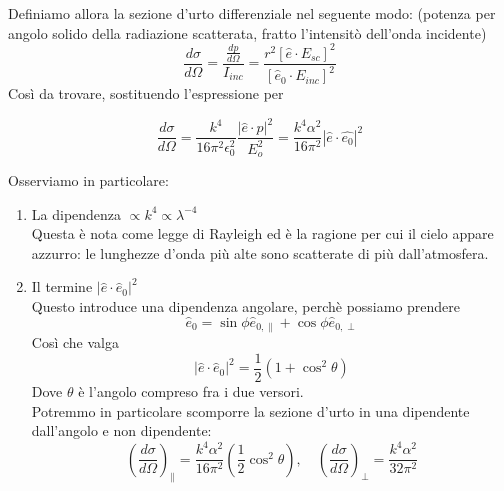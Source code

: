 \documentclass{report}
\begin{document}
    Definiamo allora la sezione d'urto differenziale nel seguente modo: (potenza per angolo solido della radiazione scatterata, fratto l'intensitò dell'onda incidente)
    \begin{equation}
        \frac{d\sigma}{d\Omega} = \frac{\frac{dp}{d\Omega}}{I_{inc}} = \frac{r^2[\hat{e}\cdot E_{sc}]^2}{[\hat{e}_0 \cdot E_{inc}]^2}
    \end{equation}
    Così da trovare, sostituendo l'espressione per 
    \begin{tcolorbox}[colback=doc!15, colframe=black, boxrule=1pt]
    \begin{equation}
        \frac{d\sigma}{d\Omega} = \frac{k^4}{16\pi^2\epsilon_0^2}\frac{|\hat{e}\cdot p|^2}{E_o^2} = \frac{k^4\alpha^2}{16\pi^2}|\hat{e}\cdot \hat{e_0}|^2
    \end{equation}
    \end{tcolorbox}

    Osserviamo in particolare: 
    \begin{enumerate}
        \item La dipendenza $\propto k^4 \propto \lambda^{-4}$ \\
        Questa è nota come legge di Rayleigh ed è la ragione per cui il cielo appare azzurro: le lunghezze d'onda più alte sono scatterate di più dall'atmosfera.
        \item Il termine $|\hat{e}\cdot \hat{e}_0|^2$ \\ 
        Questo introduce una dipendenza angolare, perchè possiamo prendere
        \begin{equation}
            \hat{e}_0 = \sin\phi \hat{e}_{0, \parallel} + \cos\phi \hat{e}_{0, \perp} 
        \end{equation}
        Così che valga 
        \begin{equation}
            |\hat{e}\cdot \hat{e}_0|^2 = \frac{1}{2}(1+\cos^2\theta)
        \end{equation}
        Dove $\theta$ è l'angolo compreso fra i due versori. \\
        Potremmo in particolare scomporre la sezione d'urto in una dipendente dall'angolo e non dipendente: 
        \begin{equation}
            \left(\frac{d\sigma}{d\Omega}\right)_{\parallel} = \frac{k^4\alpha^2}{16\pi^2}\left(\frac{1}{2}\cos^2\theta \right), \quad \left(\frac{d\sigma}{d\Omega}\right)_{\perp} = \frac{k^4\alpha^2}{32\pi^2}
        \end{equation}

    \end{enumerate}
\end{document}
